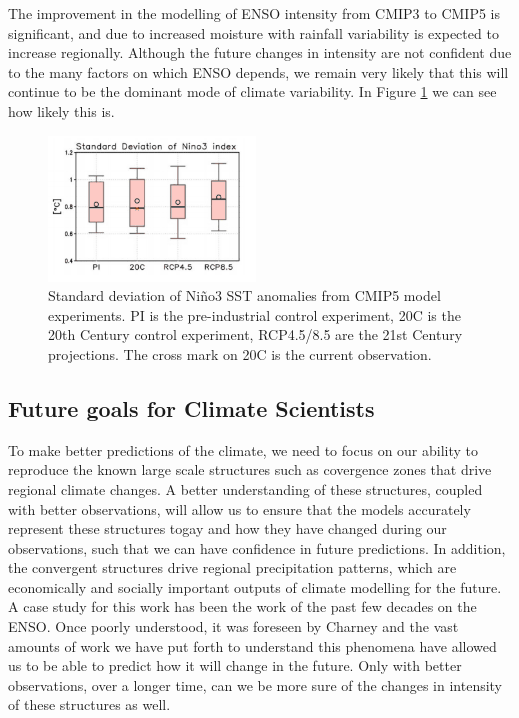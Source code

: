 The improvement in the modelling of ENSO intensity from CMIP3 to CMIP5 is significant, and due to increased moisture with rainfall variability is expected to increase regionally.
Although the future changes in intensity are not confident due to the many factors on which ENSO depends, we remain very likely that this will continue to be the dominant mode of climate variability.
In Figure \ref{fig:1414} we can see how likely this is.\\

\begin{figure}[h!]
\begin{center}
  \includegraphics[width=0.490\textwidth]{figure1414.png}
  \caption{Standard deviation of Niño3 SST anomalies from CMIP5 model experiments.
    PI is the pre-industrial control experiment, 20C is the 20th Century control experiment, RCP4.5/8.5 are the 21st Century projections.
    The cross mark on 20C is the current observation.}
  \label{fig:1414}
\end{center}
\end{figure}

\subsection{Future goals for Climate Scientists}

To make better predictions of the climate, we need to focus on our ability to reproduce the known large scale structures such as covergence zones that drive regional climate changes.
A better understanding of these structures, coupled with better observations, will allow us to ensure that the models accurately represent these structures togay and how they have changed during our observations, such that we can have confidence in future predictions.
In addition, the convergent structures drive regional precipitation patterns, which are economically and socially important outputs of climate modelling for the future. \\

A case study for this work has been the work of the past few decades on the ENSO.
Once poorly understood, it was foreseen by Charney and the vast amounts of work we have put forth to understand this phenomena have allowed us to be able to predict how it will change in the future.
Only with better observations, over a longer time, can we be more sure of the changes in intensity of these structures as well.\\






